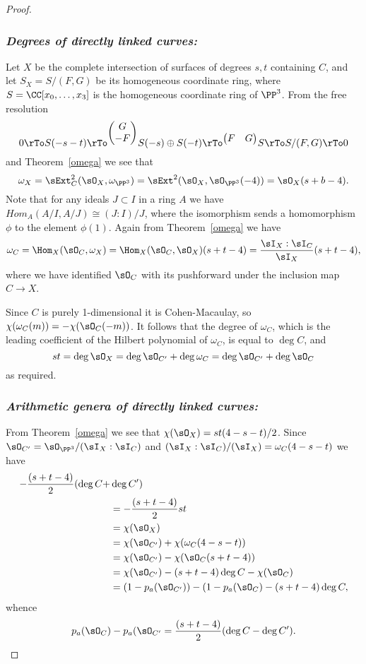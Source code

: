 \begin{proof}
\subsubsection{\it Degrees of directly linked curves:}
Let $X$ be the complete intersection of surfaces of degrees $s,t$ containing $C$, and let $S_X = S/(F,G)$ be its homogeneous coordinate ring, where
$S = \CC[x_0,\dots,x_3]$ is the homogeneous coordinate ring of $\PP^3$.
From the free resolution
$$
0\rTo S(-s-t) \rTo^{
\begin{pmatrix}
 G \\ -F
\end{pmatrix}}
 S(-s)\oplus S(-t) \rTo^{
\begin{pmatrix}
 F & G
\end{pmatrix}}
 S \rTo S/(F,G) \rTo 0
$$
 and Theorem~\ref{omega} we see that
 $$
\omega_X =  \sExt^2_C(\sO_X, \omega_{\PP^3}) =\sExt^2(\sO_X, \sO_{\PP^3}(-4)) = \sO_X(s+b-4).
 $$
Note that for any ideals $J\subset I$ in a ring $A$ we have $Hom_A(A/I, A/J) \cong (J:I)/J$, where the isomorphism
sends a homomorphism $\phi$ to the element $\phi(1)$. Again from Theorem~\ref{omega} we have 
$$
\omega_C = \Hom_X(\sO_C, \omega_X) = \Hom_X(\sO_C, \sO_X)(s+t-4) = \frac{\sI_X:\sI_C}{\sI_X}(s+t-4),
$$
where we have identified $\sO_C$ with its pushforward under the inclusion map $C\to X$. 

Since $C$ is purely 1-dimensional it is Cohen-Macaulay, so
$\chi(\omega_C(m)) = -\chi(\sO_C(-m))$. It follows that the degree of $\omega_C$, which is the leading coefficient of the Hilbert polynomial of $\omega_C$, is 
equal to $\deg C$, and 
$$
st = \deg \sO_X =\deg \sO_{C'}+\deg \omega_C = \deg \sO_{C'}+\deg \sO_C
$$
as required.

\subsubsection{\it Arithmetic genera of directly linked curves:}

From Theorem~\ref{omega} we see that $\chi(\sO_X) = st(4-s-t)/2$. Since $\sO_{C'} = \sO_{\PP^3}/(\sI_X : \sI_C)$ and
$(\sI_X : \sI_C)/(\sI_X) = \omega_C(4-s-t)$ we have
$$
\begin{aligned}
-\frac{(s+t-4)}{2} (\deg C +& \deg C') \\&= -\frac{(s+t-4)}{2}st \\
&= \chi(\sO_X) \\&=  \chi(\sO_{C'})+\chi(\omega_C(4-s-t)) \\&= \chi(\sO_{C'})-\chi(\sO_C(s+t-4)) \\&= \chi(\sO_{C'})-(s+t-4)\deg C-\chi(\sO_C)
\\&= (1-p_a(\sO_{C'})) - (1-p_a(\sO_C) -(s+t-4)\deg C,
\end{aligned}
$$
whence 
$$
p_a(\sO_C) -p_a(\sO_{C'} = \frac{(s+t-4)}{2} (\deg C - \deg C'). 
$$
 \end{proof}

